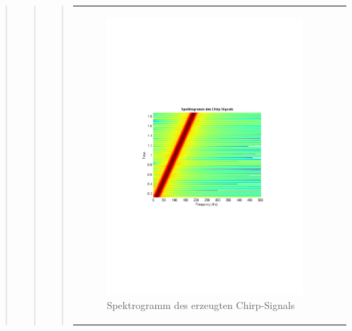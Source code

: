 \begin{quote}
\begin{quote}
\begin{quote}
\begin{center}
\begin{tabular}{ll}
\begin{minipage}{0.6\textwidth}
                        \begin{figure}[H]
                            \label{fig:}
                            \includegraphics[scale=0.63, trim = 3cm 9cm 3cm
                            9cm,
                            clip]{./Bilder/bsp_chirp_spectrogram}
                            \caption{Spektrogramm des erzeugten Chirp-Signals}
                        \end{figure}
                    \vspace{-1.5em}
    
                    \end{minipage}
    
                \end{tabular}
                \end{center}
                

\end{quote}
\end{quote}
\end{quote}

